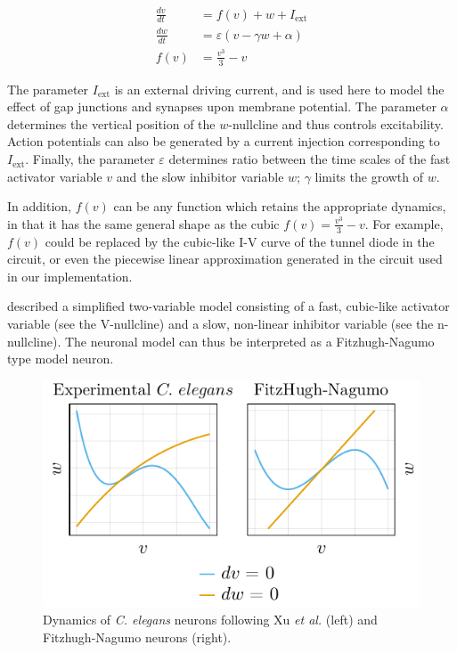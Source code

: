 \documentclass[
    11pt,
]{article}
\begin{document}
\begin{equation}
    \label{eq: fhn}
    \begin{aligned}
        \frac{dv}{dt} &= f(v) + w + I_\mathrm{ext}\\
        \frac{dw}{dt} &= \varepsilon(v - \gamma w + \alpha)\\
        f(v) &= \frac{v^3}{3} - v
    \end{aligned}
\end{equation}

The parameter $I_\mathrm{ext}$ is an external driving current, and is used here to model the effect of gap junctions and synapses upon membrane potential.  The parameter $\alpha$ determines the vertical position of the $w$-nullcline and thus controls excitability. Action potentials can also be generated by a current injection corresponding to $I_\mathrm{ext}$. Finally, the parameter $\varepsilon$ determines ratio between the time scales of the fast activator variable $v$ and the slow inhibitor variable $w$; $\gamma$ limits the growth of $w$. 

In addition, $f(v)$ can be any function which retains the appropriate dynamics, in that it has the same general shape as the cubic $f(v) = \frac{v^3}{3} - v$.  For example, $f(v)$ could be replaced by the cubic-like I-V curve of the tunnel diode in the \citet{nagumo1962} circuit, or even the piecewise linear approximation generated in the \citet{keener1983} circuit used in our implementation. 

\citet{xu2018} described a simplified two-variable model consisting of a fast, cubic-like activator variable (see the V-nullcline) and a slow, non-linear inhibitor variable (see the n-nullcline). The \citet{xu2018} neuronal model can thus be interpreted as a Fitzhugh-Nagumo type model neuron. 

\begin{figure}[h!]
    \label{fig: nm nullclines}
    \centering
    \includegraphics{figures/neuron_dynamics/neuron_dynamics.pdf}
    \caption{Dynamics of \textit{C. elegans} neurons following Xu \textit{et al.} \cite{xu2018} (left) and Fitzhugh-Nagumo neurons \cite{fitzhugh1955, nagumo1962} (right).}
\end{figure}
\end{document}
